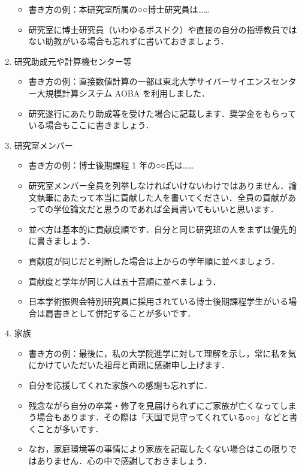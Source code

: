 \begin{enumerate}
\begin{itemize}
        \item 書き方の例：本研究室所属の○○博士研究員は……
        \item 研究室に博士研究員（いわゆるポスドク）や直接の自分の指導教員ではない助教がいる場合も忘れずに書いておきましょう．
    \end{itemize}
    \item 研究助成元や計算機センター等
    \begin{itemize}
        \item 書き方の例：直接数値計算の一部は東北大学サイバーサイエンスセンター大規模計算システム AOBA を利用しました．
        \item 研究遂行にあたり助成等を受けた場合に記載します．奨学金をもらっている場合もここに書きましょう．
    \end{itemize}
    \item 研究室メンバー
    \begin{itemize}
        \item 書き方の例：博士後期課程 1 年の○○氏は……
        \item 研究室メンバー全員を列挙しなければいけないわけではありません．論文執筆にあたって本当に貢献した人を書いてください．全員の貢献があっての学位論文だと思うのであれば全員書いてもいいと思います．
        \item 並べ方は基本的に貢献度順です．自分と同じ研究班の人をまずは優先的に書きましょう．
        \item 貢献度が同じだと判断した場合は上からの学年順に並べましょう．
        \item 貢献度と学年が同じ人は五十音順に並べましょう．
        \item 日本学術振興会特別研究員に採用されている博士後期課程学生がいる場合は肩書きとして併記することが多いです．
    \end{itemize}
    \item 家族
    \begin{itemize}
        \item 書き方の例：最後に，私の大学院進学に対して理解を示し，常に私を気にかけていただいた祖母と両親に感謝申し上げます．
        \item 自分を応援してくれた家族への感謝も忘れずに．
        \item 残念ながら自分の卒業・修了を見届けられずにご家族が亡くなってしまう場合もあります．その際は「天国で見守ってくれている○○」などと書くことが多いです．
        \item なお，家庭環境等の事情により家族を記載したくない場合はこの限りではありません．心の中で感謝しておきましょう．
    \end{itemize}
\end{enumerate}

